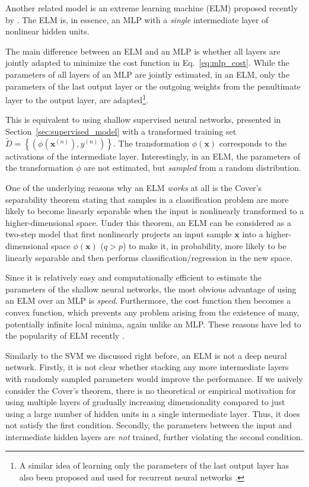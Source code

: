 \documentclass[dissertation,nocontribution,draft*]{aaltoseries}
\newcommand{\vect}[1]{\mathbf{#1}}
\newcommand{\vx}[0]{\vect{x}}
\begin{document}
Another related model is an extreme learning machine
(ELM) proposed
recently by \citet{Huang2006}. The ELM is, in essence, an
MLP with a \textit{single} intermediate layer of nonlinear
hidden units.

The main difference between an ELM and an MLP is whether all
layers are jointly adapted to minimize the cost function in
Eq.~\eqref{eq:mlp_cost}. While the parameters of all layers
of an MLP are jointly estimated, in an ELM, only the
parameters of the last output layer or the outgoing weights
from the penultimate layer to the output layer, are
adapted\footnote{
A similar idea of learning only the parameters of the last
output layer has also been proposed and used for
recurrent neural networks \citep[see, e.g.,][]{Jaeger2009}.
}.

This is equivalent to using shallow supervised neural
networks, presented in Section~\ref{sec:supervised_model}
with a transformed training set $\tilde{D}=\left\{ \left(
\phi(\vx^{(n)}), y^{(n)} \right) \right\}$. The
transformation $\phi(\vx)$ corresponds to the activations of
the intermediate layer.  Interestingly, in an ELM, the
parameters of the transformation $\phi$ are not estimated,
but \textit{sampled} from a random distribution.

One of the underlying reasons why an ELM \textit{works} at
all is the Cover's separability theorem
\citep{Cover1965}
stating that samples in a
classification problem are more likely to become linearly
separable when the input is nonlinearly transformed to a
higher-dimensional space. Under this theorem, an ELM can be
considered as a two-step model that first nonlinearly
projects an input sample $\vx$ into a higher-dimensional
space $\phi(\vx)$ ($q > p$) to make it, in probability, more
likely to be linearly separable and then performs
classification/regression in the new space.

Since it is relatively easy and computationally efficient to
estimate the parameters of the shallow neural networks, the
most obvious advantage of using an ELM over an MLP is
\textit{speed}. Furthermore, the cost function then
becomes a convex function, which prevents any problem
arising from the existence of many, potentially infinite
local minima, again unlike an MLP. These reasons have led
to the popularity of ELM recently \citep{Huang2011}.

Similarly to the SVM we discussed right before, an ELM is
not a deep neural network.  Firstly, it
is not clear whether stacking any more intermediate layers
with randomly sampled parameters would improve the
performance.  If we naively consider the Cover's theorem,
there is no theoretical or empirical motivation for using
multiple layers of gradually increasing dimensionality
compared to just using a large number of hidden units in a
single intermediate layer.  Thus, it does not satisfy the
first condition.  Secondly, the parameters between the input
and intermediate hidden layers are \textit{not} trained,
further violating the second condition.
\end{document}
